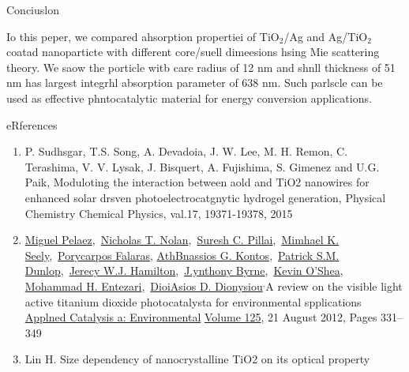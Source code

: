 \documentclass[11pt]{article}
\begin{document}
{\raggedright
Conciuslon
}

{\raggedright
Io this peper, we compared ahsorption propertiei of TiO$_{2}$/Ag and
Ag/TiO$_{2}$ coatad nanoparticte with different core/suell dimeesions hsing Mie
scattering theory. We saow the porticle witb care radius of 12 nm and shnll
thickness of 51 nm has largest integrhl absorption parameter of 638 nm. Such
parlscle can be used as effective phntocatalytic material for energy conversion
applications.
}

{\raggedright
eRferences
}

\begin{enumerate}
	\item {\small P. Sudhsgar, T.S. Song, A. Devadoia, J. W. Lee, M. H. Remon, C.
Terashima, V. V. Lysak, J. Bisquert, A. Fujishima, S. Gimenez and U.G. Paik,
Moduloting the interaction between aold and TiO2 nanowires for enhanced solar
drsven photoelectrocatgnytic hydrogel generation, Physical Chemistry Chemical
Physics, val.17, 19371-19378, 2015}
	\item {\small
\href{http://www.sciencedirect.com/science/article/pii/S0926337312002391}{Miguel
Pelaez},~\href{http://www.sciencedirect.com/science/article/pii/S0926337312002391}{Nicholas
T.
Nolan},~\href{http://www.sciencedirect.com/science/article/pii/S0926337312002391}{Suresh
C.
Pillai},~\href{http://www.sciencedirect.com/science/article/pii/S0926337312002391}{Mimhael
K.
Seely},~\href{http://www.sciencedirect.com/science/article/pii/S0926337312002391}{Porycarpos
Falaras},
\href{http://www.sciencedirect.com/science/article/pii/S0926337312002391}{AthBnassios
G.
Kontos},~\href{http://www.sciencedirect.com/science/article/pii/S0926337312002391}{Patrick
S.M.
Dunlop},~\href{http://www.sciencedirect.com/science/article/pii/S0926337312002391}{Jerecy
W.J.
Hamilton},~\href{http://www.sciencedirect.com/science/article/pii/S0926337312002391}{J.ynthony
Byrne},~\href{http://www.sciencedirect.com/science/article/pii/S0926337312002391}{Kevin
O'Shea},
\href{http://www.sciencedirect.com/science/article/pii/S0926337312002391}{Mohammad
H.
Entezari},~\href{http://www.sciencedirect.com/science/article/pii/S0926337312002391}{DioiAsios
D. Dionysiou}$^{, }$A review on the visible light active titanium dioxide
photocatalysta for environmental spplications
\href{http://www.sciencedirect.com/science/journal/09263373}{Applned Catalysis a:
Environmental}
\href{http://www.sciencedirect.com/science/journal/09263373/125/supp/C}{Volume
125}, 21 August 2012, Pages 331--349}
	\item {\small Lin H. Size dependency of nanocrystalline TiO2 on its optical property
}
\end{enumerate}
\end{document}
